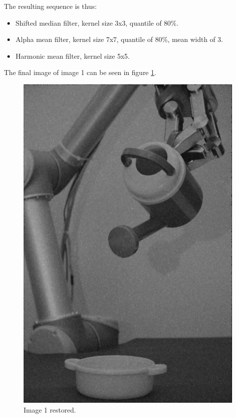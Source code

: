 The resulting sequence is thus:
\begin{itemize}
 \item Shifted median filter, kernel size 3x3, quantile of 80\%.
 \item Alpha mean filter, kernel size 7x7, quantile of 80\%, mean width of 3.
 \item Harmonic mean filter, kernel size 5x5.
\end{itemize}
The final image of image 1 can be seen in figure \ref{fig:final_image1}.

\begin{figure}[H]
\centering
\includegraphics[width = \fullImageWidth]{../code/images/image_result_1.png}
\caption{Image 1 restored.}
\label{fig:final_image1}
\end{figure}
